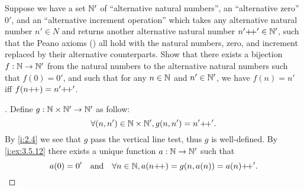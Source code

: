\begin{ex}\label{i:ex:3.5.13}
  Suppose we have a set \(\mathbb{N}'\) of ``alternative natural numbers'', an ``alternative zero'' \(0'\), and an ``alternative increment operation'' which takes any alternative natural number \(n' \in N\) and returns another alternative natural number \(n'{+}\!{+}' \in \mathbb{N}'\), such that the Peano axioms () all hold with the natural numbers, zero, and increment replaced by their alternative counterparts.
  Show that there exists a bijection \(f : \mathbb{N} \to \mathbb{N}'\) from the natural numbers to the alternative natural numbers such that \(f(0) = 0'\), and such that for any \(n \in \mathbb{N}\) and \(n' \in \mathbb{N}'\), we have \(f(n) = n'\) iff \(f(n{+}\!{+}) = n'{+}\!{+}'\).
\end{ex}

\begin{proof}[]
  Define \(g : \mathbb{N} \times \mathbb{N}' \to \mathbb{N}'\) as follow:
  \[
    \forall (n, n') \in \mathbb{N} \times \mathbb{N}', g(n, n') = n'{+}\!{+}'.
  \]
  By \cref{i:2.4} we see that \(g\) pass the vertical line test, thus \(g\) is well-defined.
  By \cref{i:ex:3.5.12} there exists a unique function \(a : \mathbb{N} \to \mathbb{N}'\) such that
  \[
    a(0) = 0' \quad \text{and} \quad \forall n \in \mathbb{N}, a(n{+}\!{+}) = g(n, a(n)) = a(n){+}\!{+}'.
  \]


\end{proof}
